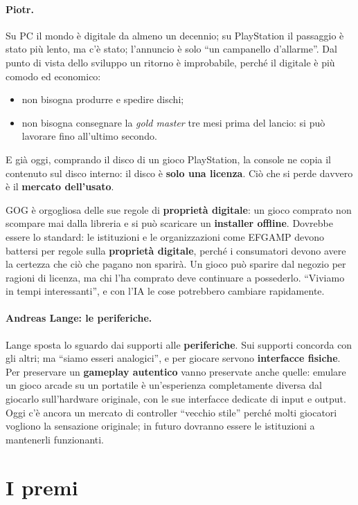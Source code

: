 \paragraph{Piotr.} Su PC il mondo è digitale da almeno un decennio; su PlayStation
il passaggio è stato più lento, ma c'è stato; l'annuncio è solo ``un campanello
d'allarme''. Dal punto di vista dello sviluppo un ritorno è improbabile, perché il
digitale è più comodo ed economico:
\begin{itemize}
  \item non bisogna produrre e spedire dischi;
  \item non bisogna consegnare la \emph{gold master} tre mesi prima del lancio:
        si può lavorare fino all'ultimo secondo.
\end{itemize}
E già oggi, comprando il disco di un gioco PlayStation, la console ne copia il
contenuto sul disco interno: il disco è \textbf{solo una licenza}. Ciò che si
perde davvero è il \textbf{mercato dell'usato}.

GOG è orgogliosa delle sue regole di \textbf{proprietà digitale}: un gioco
comprato non scompare mai dalla libreria e si può scaricare un
\textbf{installer offline}. Dovrebbe essere lo standard: le istituzioni e le
organizzazioni come EFGAMP devono battersi per regole sulla \textbf{proprietà
digitale}, perché i consumatori devono avere la certezza che ciò che pagano non
sparirà. Un gioco può sparire dal negozio per ragioni di licenza, ma chi l'ha
comprato deve continuare a possederlo. ``Viviamo in tempi interessanti'', e con
l'IA le cose potrebbero cambiare rapidamente.

\paragraph{Andreas Lange: le periferiche.} Lange sposta lo sguardo dai supporti
alle \textbf{periferiche}. Sui supporti concorda con gli altri; ma ``siamo esseri
analogici'', e per giocare servono \textbf{interfacce fisiche}. Per preservare un
\textbf{gameplay autentico} vanno preservate anche quelle: emulare un gioco arcade
su un portatile è un'esperienza completamente diversa dal giocarlo sull'hardware
originale, con le sue interfacce dedicate di input e output. Oggi c'è ancora un
mercato di controller ``vecchio stile'' perché molti giocatori vogliono la
sensazione originale; in futuro dovranno essere le istituzioni a mantenerli
funzionanti.

\section{I premi}
\label{sec:c1-4-premi}

